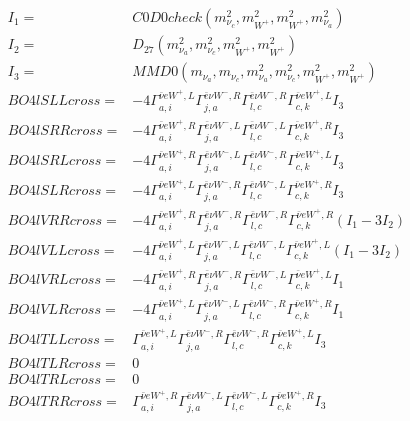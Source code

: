 \documentclass[A4,landscape]{article}
\begin{document}
\begin{align} 
I_1 = & C0D0check(m^2_{\nu_{{c}}}, m^2_{W^+}, m^2_{W^+}, m^2_{\nu_{{a}}}) \\ 
I_2 = & D_{27}(m^2_{\nu_{{a}}}, m^2_{\nu_{{c}}}, m^2_{W^+}, m^2_{W^+}) \\ 
I_3 = & MMD0(m_{\nu_{{a}}}, m_{\nu_{{c}}}, m^2_{\nu_{{a}}}, m^2_{\nu_{{c}}}, m^2_{W^+}, m^2_{W^+}) \\ 
  BO4lSLLcross= & -4  \Gamma^{\bar{\nu}e W^+ ,L}_{a, i} \Gamma^{\bar{e}\nu W^-,R}_{j, a} \Gamma^{\bar{e}\nu W^-,R}_{l, c} \Gamma^{\bar{\nu}e W^+ ,L}_{c, k} I_3 \\ 
  BO4lSRRcross= & -4  \Gamma^{\bar{\nu}e W^+ ,R}_{a, i} \Gamma^{\bar{e}\nu W^-,L}_{j, a} \Gamma^{\bar{e}\nu W^-,L}_{l, c} \Gamma^{\bar{\nu}e W^+ ,R}_{c, k} I_3 \\ 
  BO4lSRLcross= & -4  \Gamma^{\bar{\nu}e W^+ ,R}_{a, i} \Gamma^{\bar{e}\nu W^-,L}_{j, a} \Gamma^{\bar{e}\nu W^-,R}_{l, c} \Gamma^{\bar{\nu}e W^+ ,L}_{c, k} I_3 \\ 
  BO4lSLRcross= & -4  \Gamma^{\bar{\nu}e W^+ ,L}_{a, i} \Gamma^{\bar{e}\nu W^-,R}_{j, a} \Gamma^{\bar{e}\nu W^-,L}_{l, c} \Gamma^{\bar{\nu}e W^+ ,R}_{c, k} I_3 \\ 
  BO4lVRRcross= & -4  \Gamma^{\bar{\nu}e W^+ ,R}_{a, i} \Gamma^{\bar{e}\nu W^-,R}_{j, a} \Gamma^{\bar{e}\nu W^-,R}_{l, c} \Gamma^{\bar{\nu}e W^+ ,R}_{c, k} (I_1 - 3 I_2) \\ 
  BO4lVLLcross= & -4  \Gamma^{\bar{\nu}e W^+ ,L}_{a, i} \Gamma^{\bar{e}\nu W^-,L}_{j, a} \Gamma^{\bar{e}\nu W^-,L}_{l, c} \Gamma^{\bar{\nu}e W^+ ,L}_{c, k} (I_1 - 3 I_2) \\ 
  BO4lVRLcross= & -4  \Gamma^{\bar{\nu}e W^+ ,R}_{a, i} \Gamma^{\bar{e}\nu W^-,R}_{j, a} \Gamma^{\bar{e}\nu W^-,L}_{l, c} \Gamma^{\bar{\nu}e W^+ ,L}_{c, k} I_1 \\ 
  BO4lVLRcross= & -4  \Gamma^{\bar{\nu}e W^+ ,L}_{a, i} \Gamma^{\bar{e}\nu W^-,L}_{j, a} \Gamma^{\bar{e}\nu W^-,R}_{l, c} \Gamma^{\bar{\nu}e W^+ ,R}_{c, k} I_1 \\ 
  BO4lTLLcross= &  \Gamma^{\bar{\nu}e W^+ ,L}_{a, i} \Gamma^{\bar{e}\nu W^-,R}_{j, a} \Gamma^{\bar{e}\nu W^-,R}_{l, c} \Gamma^{\bar{\nu}e W^+ ,L}_{c, k} I_3 \\ 
  BO4lTLRcross= & 0 \\ 
  BO4lTRLcross= & 0 \\ 
  BO4lTRRcross= &  \Gamma^{\bar{\nu}e W^+ ,R}_{a, i} \Gamma^{\bar{e}\nu W^-,L}_{j, a} \Gamma^{\bar{e}\nu W^-,L}_{l, c} \Gamma^{\bar{\nu}e W^+ ,R}_{c, k} I_3 \\ 
\end{align} 
\end{document}
